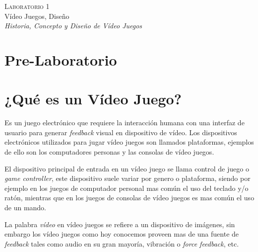 \begin{center}
\textsc{\Large Laboratorio 1}~\\
{\large Vídeo Juegos, Diseño}~\\
\emph{Historia, Concepto y Diseño de Vídeo Juegos}
\end{center}

\section{Pre-Laboratorio}

\section{¿Qué es un Vídeo Juego?}
Es un juego electrónico que requiere la interacción humana con una interfaz de usuario para generar \emph{feedback} visual en dispositivo de vídeo. Los dispositivos electrónicos utilizados para jugar vídeo juegos son llamados plataformas, ejemplos de ello son los computadores personas y las consolas de vídeo juegos.

El dispositivo principal de entrada en un vídeo juego se llama control de juego o \emph{game controller}, este dispositivo suele variar por genero o plataforma, siendo por ejemplo en los juegos de computador personal mas común el uso del teclado y/o ratón, mientras que en los juegos de consolas de vídeo juegos es mas común el uso de un mando.

La palabra \emph{vídeo} en vídeo juegos se refiere a un dispositivo de imágenes, sin embargo los vídeo juegos como hoy conocemos proveen mas de una fuente de \emph{feedback} tales como audio en su gran mayoría, vibración o \emph{force feedback}, etc.


